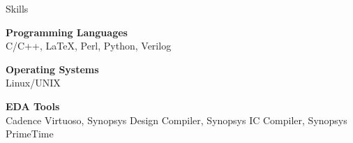 
\begin{rSection}{Skills}

{\bf Programming Languages} \\
C/C++, \LaTeX, Perl, Python, Verilog 

{\bf Operating Systems} \\
Linux/UNIX


{\bf EDA Tools} \\
Cadence Virtuoso, Synopsys Design Compiler, Synopsys IC Compiler, Synopsys PrimeTime 

\end{rSection}
